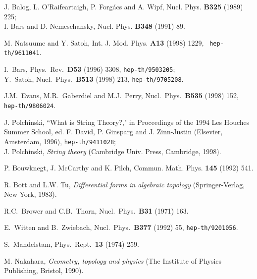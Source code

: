 \documentclass[a4paper,12pt]{article}
\begin{document}
\begin{thebibliography}{999}
J. Balog, L. O'Raifeartaigh, P. Forg\'{a}cs and A. Wipf, Nucl. Phys. {\bf
B325} (1989) 225;\\
I. Bars and D. Nemeschansky, Nucl. Phys. {\bf B348} (1991) 89.

M. Natsuume and Y. Satoh, Int. J. Mod. Phys. {\bf A13} (1998) 1229, {\tt
hep-th/9611041}.

I.~Bars,
Phys.\ Rev.\ {\bf D53} (1996) 3308,
{\tt hep-th/9503205};\\
Y.~Satoh,
Nucl.\ Phys.\ {\bf B513} (1998) 213,
{\tt hep-th/9705208}.

J.M.~Evans, M.R.~Gaberdiel and M.J.~Perry,
Nucl.\ Phys.\ {\bf B535} (1998) 152,
{\tt hep-th/9806024}.

J. Polchinski, ``What is String Theory?,"
in Proceedings of the 1994 Les Houches Summer School,
ed. F. David, P. Ginsparg and J. Zinn-Justin (Elsevier, Amsterdam, 1996),
{\tt hep-th/9411028}; \\
J. Polchinski, {\it String theory} (Cambridge Univ. Press, Cambridge, 1998).

P. Bouwknegt, J. McCarthy and K. Pilch, Commun. Math. Phys. {\bf 145} (1992)
541.

R. Bott and  L.W. Tu, {\it Differential forms in algebraic topology}
(Springer-Verlag, New York, 1983).

R.C.~Brower and C.B.~Thorn,
Nucl.\ Phys.\ {\bf B31} (1971) 163.

E.~Witten and B.~Zwiebach,
Nucl.\ Phys.\  {\bf B377} (1992) 55,
{\tt hep-th/9201056}.

S.~Mandelstam,
Phys.\ Rept.\ {\bf 13} (1974) 259.

M. Nakahara, {\it Geometry, topology and physics}
(The Institute of Physics Publishing, Bristol, 1990).

\end{thebibliography}
\end{document}
